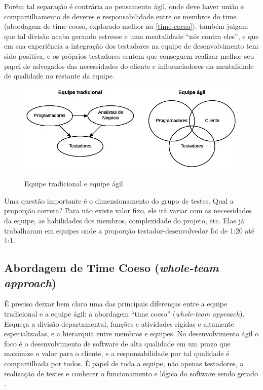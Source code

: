 \documentclass[
	12pt,				%
	openright,			%
	oneside,			%
	a4paper,			%
	english,			%
	brazil,				%
	]{abntex2}
\begin{document}
Porém tal separação é contrária ao pensamento ágil, onde deve haver união e compartilhamento de deveres e responsabilidade entre os membros do time (abordagem de time coeso, explorado melhor na \autoref{time-coeso}).  também julgam que tal divisão acaba gerando estresse e uma mentalidade ``nós contra eles'', e que em sua experiência a integração dos testadores na equipe de desenvolvimento tem sido positiva, e os próprios testadores sentem que conseguem realizar melhor seu papel de advogados das necessidades do cliente e influenciadores da mentalidade de qualidade no restante da equipe.

\begin{figure}[H]
    \centering
    \caption{Equipe tradicional e equipe ágil}
    \graphicspath{ {./graphics/agile/} }
    \includegraphics[scale=1.0]{functional-and-agile-teams-alt}
    \label{fig:functional-and-agile-teams}
\end{figure}

Uma questão importante é o dimensionamento do grupo de testes. Qual a proporção correta? Para  não existe valor fixo, ele irá variar com as necessidades da equipe, as habilidades dos membros, complexidade do projeto, etc. Elas já trabalharam em equipes onde a proporção testador-desenvolvedor foi de 1:20 até 1:1.

\subsection{Abordagem de Time Coeso (\emph{whole-team approach})}
\label{time-coeso}

É preciso deixar bem claro uma das principais diferenças entre a equipe tradicional e a equipe ágil: a abordagem ``time coeso'' (\emph{whole-team approach}). Esqueça a divisão departamental, funções e atividades rígidas e altamente especializadas, e a hierarquia entre membros e equipes. No desenvolvimento ágil o foco é o desenvolvimento de software de alta qualidade em um prazo que maximize o valor para o cliente, e a responsabilidade por tal qualidade é compartilhada por todos. É papel de toda a equipe, não apenas testadores, a realização de testes e conhecer o funcionamento e lógica do software sendo gerado \cite{crispin2009, crispin2014}.
\end{document}

